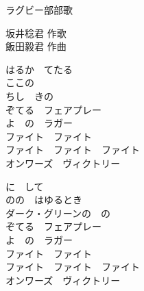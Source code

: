 \documentclass[10pt,b5j]{tarticle} %
\begin{document}
\begin{minipage}[c]{0.7\hsize} %
    \begin{center}
        {\LARGE
            ラグビー部部歌 %
        }
        {\small 
        }
    \end{center}
\end{minipage}
\begin{minipage}[c]{0.3\hsize} %
    \begin{flushright} %
        坂井稔君 作歌\\飯田毅君 作曲 %
    \end{flushright}
\end{minipage}

\vspace{1.5em} %
\newcommand{\linespace}{0.5em} %
\newcommand{\blocksize}{0.5\hsize} %
\begin{enumerate} %
    \begin{minipage}[c]{\blocksize}
    
        \vspace{\linespace}
        \item
        はるか　てたる\\
        ここの　\\
        ちし　きの\\
        ぞてる　フェアプレー\\
        よ　の　ラガー\\
        ファイト　ファイト\\
        ファイト　ファイト　ファイト\\
        オンワーズ　ヴィクトリー
        
        \vspace{\linespace}
        \item
        に　して\\
        のの　はゆるとき\\
        ダーク・グリーンの　の\\
        ぞてる　フェアプレー\\
        よ　の　ラガー\\
        ファイト　ファイト\\
        ファイト　ファイト　ファイト\\
        オンワーズ　ヴィクトリー
    
    \end{minipage}
\end{enumerate} %
\end{document}

